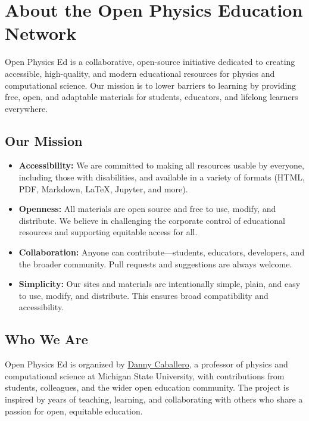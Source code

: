 \section{About the Open Physics Education
Network}\label{about-the-open-physics-education-network}

Open Physics Ed is a collaborative, open-source initiative dedicated to
creating accessible, high-quality, and modern educational resources for
physics and computational science. Our mission is to lower barriers to
learning by providing free, open, and adaptable materials for students,
educators, and lifelong learners everywhere.

\subsection{Our Mission}\label{our-mission}

\begin{itemize}
\tightlist
\item
  \textbf{Accessibility:} We are committed to making all resources
  usable by everyone, including those with disabilities, and available
  in a variety of formats (HTML, PDF, Markdown, LaTeX, Jupyter, and
  more).
\item
  \textbf{Openness:} All materials are open source and free to use,
  modify, and distribute. We believe in challenging the corporate
  control of educational resources and supporting equitable access for
  all.
\item
  \textbf{Collaboration:} Anyone can contribute---students, educators,
  developers, and the broader community. Pull requests and suggestions
  are always welcome.
\item
  \textbf{Simplicity:} Our sites and materials are intentionally simple,
  plain, and easy to use, modify, and distribute. This ensures broad
  compatibility and accessibility.
\end{itemize}

\subsection{Who We Are}\label{who-we-are}

Open Physics Ed is organized by \href{https://dannycab.github.io/}{Danny
Caballero}, a professor of physics and computational science at Michigan
State University, with contributions from students, colleagues, and the
wider open education community. The project is inspired by years of
teaching, learning, and collaborating with others who share a passion
for open, equitable education.

